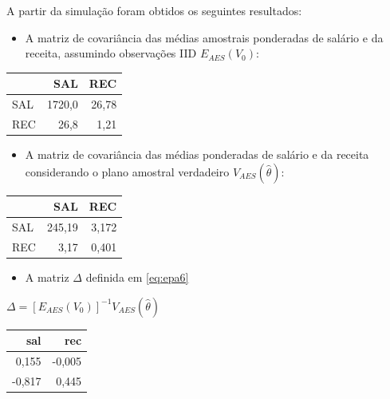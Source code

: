 \documentclass[]{book}
\providecommand{\tightlist}{%
  \setlength{\itemsep}{0pt}\setlength{\parskip}{0pt}}
\theoremstyle{definition}
\theoremstyle{definition}
\theoremstyle{definition}
\theoremstyle{remark}
\begin{document}
A partir da simulação foram obtidos os seguintes resultados:

\begin{itemize}
\tightlist
\item
  A matriz de covariância das médias amostrais ponderadas de salário e
  da receita, assumindo observações IID \(E_{AES}\left(V_{0}\right)\):
\end{itemize}

\begin{center}

\begin{tabular}{l|r|r}
\hline
  & SAL & REC\\
\hline
SAL & 1720,0 & 26,78\\
\hline
REC & 26,8 & 1,21\\
\hline
\end{tabular}
\end{center}

\begin{itemize}
\tightlist
\item
  A matriz de covariância das médias ponderadas de salário e da receita
  considerando o plano amostral verdadeiro
  \(V_{AES}\left(\hat{\theta}\right)\):
\end{itemize}

\begin{center}

\begin{tabular}{l|r|r}
\hline
  & SAL & REC\\
\hline
SAL & 245,19 & 3,172\\
\hline
REC & 3,17 & 0,401\\
\hline
\end{tabular}
\end{center}

\begin{itemize}
\tightlist
\item
  A matriz \(\Delta\) definida em \eqref{eq:epa6}
\end{itemize}

\(\Delta = \left[ E_{AES}\left( V_{0}\right)\right]^{-1}V_{AES}(\hat{\theta})\)

\begin{center}

\begin{tabular}{r|r}
\hline
sal & rec\\
\hline
0,155 & -0,005\\
\hline
-0,817 & 0,445\\
\hline
\end{tabular}
\end{center}
\end{document}
